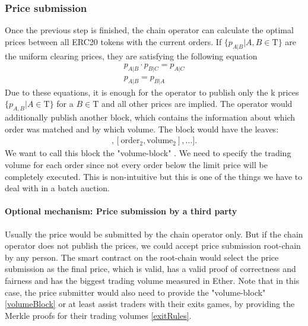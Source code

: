 \documentclass[11pt,parskip=full]{scrartcl}%
\newcommand{\Tau}{\mathrm{T}}
\begin{document}
\subsubsection{Price submission}
Once the previous step is finished, the chain operator can calculate the optimal prices between all ERC20 tokens with the current orders. If $\{p_{A|B}| A,B \in \Tau \}$  are the uniform clearing prices, they are satisfying the following equation
\begin{align}
    \label{eq:arbitrage_freeness}
  p_{A|B} \cdot p_{B|C} = p_{A|C}\\
  p_{A|B} = p_{B|A}
\end{align}
Due to these equations, it is enough for the operator to publish only the k prices $\{p_{A,B}| A \in \Tau \}$ for a $B\in \Tau$ and all other prices are implied. \newline
The operator would additionally publish another block, which contains the information about which order was matched and by which volume. The block would have the leaves:
\begin{align}
	[[\text{order}_1, \text{volume}_1], [\text{order}_2, \text{volume}_2],...].
\end{align} 
We want to call this block the "volume-block" \label{volumeBlock}. 
We need to specify the trading volume for each order since not every order below the limit price will be completely executed. This is non-intuitive but this is one of the things we have to deal with in a batch auction.
\paragraph{Optional mechanism: Price submission by a third party} Usually the price would be submitted by the chain operator only. But if the chain operator does not publish the prices, we could accept price submission root-chain by any person. The smart contract on the root-chain would select the price submission as the final price, which is valid, has a valid proof of correctness and fairness and has the biggest trading volume measured in Ether. \newline
Note that in this case, the price submitter would also need to provide the "volume-block" \ref{volumeBlock} or at least assist traders with their exits games, by providing the Merkle proofs for their trading volumes \ref{exitRules}.
\end{document}

